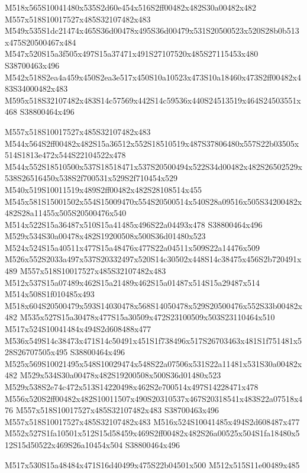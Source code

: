 \documentclass{article}
\begin{document}
\begin{multicols}{2}
M518x565S10041480x535S2d60e454x516S2ff00482x482S30a00482x482 M557x518S10017527x485S32107482x483 M549x535S1dc21474x465S36d00478x495S36d00479x531S20500523x520S28b0b513x475S20500467x484 M547x520S15a3f505x497S15a37471x491S27107520x485S27115453x480 S38700463x496 M542x518S2ea4a459x450S2ea3e517x450S10a10523x473S10a18460x473S2ff00482x483S34000482x483 M595x518S32107482x483S14c57569x442S14c59536x440S24513519x464S24503551x468 S38800464x496

M557x518S10017527x485S32107482x483 M544x564S2ff00482x482S15a36512x552S18510519x487S37806480x557S22b03505x514S1813e472x544S22104522x478 M544x552S18510500x537S18518471x537S20500494x522S34d00482x482S26502529x538S26516450x538S2f700531x529S2f710454x529 M540x519S10011519x489S2ff00482x482S28108514x455 M545x581S15001502x554S15009470x554S20500514x540S28a09516x505S34200482x482S28a11455x505S20500476x540 M514x522S15a36487x510S15a41485x496S22a04493x478 S38800464x496 M529x534S30a00478x482S19200508x500S36d01480x523 M524x524S15a40511x477S15a48476x477S22a04511x509S22a14476x509 M526x552S2033a497x537S20332497x520S14c30502x448S14c38475x456S2b720491x489 M557x518S10017527x485S32107482x483 M512x537S15a07489x462S15a21489x462S15a01487x514S15a29487x514 M514x508S1f010485x493 M518x604S20500479x593S14030478x568S14050478x529S20500476x552S33b00482x482 M535x527S15a30478x477S15a30509x472S23100509x503S23110464x510 M517x524S10041484x494S2d608488x477 M536x549S14c38473x471S14c50491x451S1f738496x517S26703463x481S1f751481x528S26707505x495 S38800464x496 M525x569S10021495x548S10029474x548S22a07506x531S22a11481x531S30a00482x482 M529x534S30a00478x482S19200508x500S36d01480x523 M529x538S2e74c472x513S14220498x462S2e700514x497S14228471x478 M556x520S2ff00482x482S10011507x490S20310537x467S20318541x483S22a07518x476 M557x518S10017527x485S32107482x483 S38700463x496 M557x518S10017527x485S32107482x483 M516x524S10041485x494S2d608487x477 M552x527S1fa10501x512S15d58459x469S2ff00482x482S26a00525x504S1fa18480x512S15d50522x469S26a10454x504 S38800464x496

\begin{center}
M517x530S15a48484x471S16d40499x475S22b04501x500 M512x515S11e00489x485 
\end{center}




\end{multicols}
\end{document}
